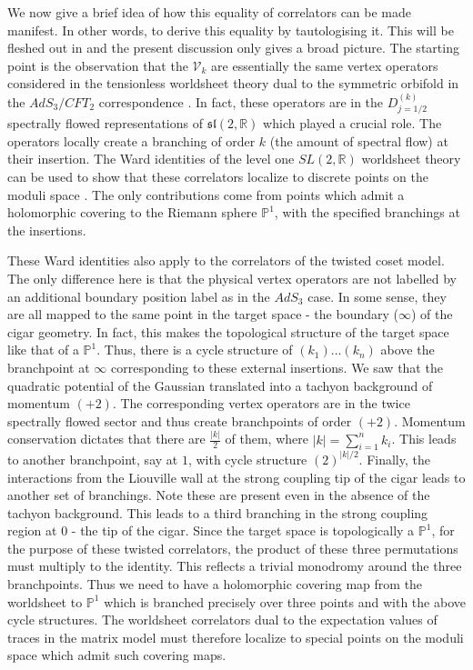 \documentclass[english]{article}
\begin{document}
We now give a brief idea of how this equality of correlators can be made manifest. In other words, to derive this equality by tautologising it. This will be fleshed out in \cite{DSDIII} and the present discussion only gives a broad picture. The starting point is the observation that the $\mathcal{V}_{k}$ are essentially the same vertex operators considered in the tensionless worldsheet theory dual to the symmetric orbifold in the $AdS_3/CFT_2$ correspondence \cite{eberhardt2020deriving, eberhardt2019worldsheet, dei2021free}. In fact, these operators are in the $D^{(k)}_{j=1/2}$ spectrally flowed representations of $\mathfrak{sl}(2,\mathbb{R})$ which played a crucial role. The operators locally create a branching of order $k$ (the amount of spectral flow) at their insertion. 
The Ward identities of the level one $SL(2,\mathbb{R})$ worldsheet theory can be used to show that these correlators localize to discrete points on the moduli space \cite{eberhardt2020deriving, Eberhardt:2020akk, Knighton:2020kuh}. The only contributions come from points which admit a holomorphic covering to the Riemann sphere $\mathbb{P}^{1}$, with the specified branchings at the insertions. 

These Ward identities also apply to the correlators of the twisted coset model. The only difference here is that the physical vertex operators are not labelled by an additional boundary position label as in the $AdS_3$ case. In some sense, they are all mapped to the same point in the target space -  the boundary ($\infty$) of the cigar geometry. In fact, this makes the topological structure of the target space like that of a $\mathbb{P}^1$. Thus, there is a cycle structure of $(k_1)...(k_n)$ above the branchpoint at $\infty$ corresponding to these external insertions.
We saw that the quadratic potential of the Gaussian translated into a tachyon background of momentum $(+2)$. 
The corresponding vertex operators are in the twice spectrally flowed sector and thus create branchpoints of order $(+2)$. Momentum conservation dictates that there are $\frac{|k|}{2}$ of them, where  $|k|=\sum_{i=1}^{n} k_i$. This leads to another branchpoint, say at $1$,  with cycle structure  
$(2)^{|k|/2}$. Finally, the interactions from the Liouville wall at the strong coupling tip of the cigar leads to another set of branchings. Note these are present even in the absence of the tachyon background.
This leads to a third branching in the strong coupling region at $0$ - the tip of the cigar. Since the target space is topologically a ${\mathbb P}^{1}$, for the purpose of these twisted correlators, the product of these three permutations must multiply to the identity. This reflects a trivial monodromy around the three branchpoints. 
Thus we need to have a holomorphic covering map from the worldsheet to ${\mathbb P}^{1}$ which is branched precisely over three points and with the above cycle structures. The worldsheet correlators dual to the expectation values of traces in the matrix model must therefore localize to special points on the moduli space which admit such covering maps.  
\end{document}

